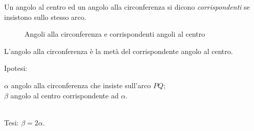 \begin{definizione}
Un angolo al centro ed un angolo alla circonferenza si dicono 
\emph{corrispondenti} se insistono sullo stesso arco.
\end{definizione}


\begin{inaccessibleblock}
 \begin{figure}[htb]\label{fig:ang_circonf}
  \centering
  \caption{Angoli alla circonferenza e corrispondenti angoli al 
centro}
\end{figure}
\end{inaccessibleblock}

\begin{teorema}
L'angolo alla circonferenza è la metà del corrispondente angolo al 
centro.
\end{teorema}

\noindent \begin{minipage}{0.09\textwidth} Ipotesi: \end{minipage} \begin{minipage}{0.6\textwidth} $\alpha$ angolo alla circonferenza che insiste 
sull'arco $PQ$; \\ $\beta$ angolo al centro corrispondente ad $\alpha$.
\end{minipage}\\

Tesi: \hspace{10pt} $\beta = 2\alpha$.


